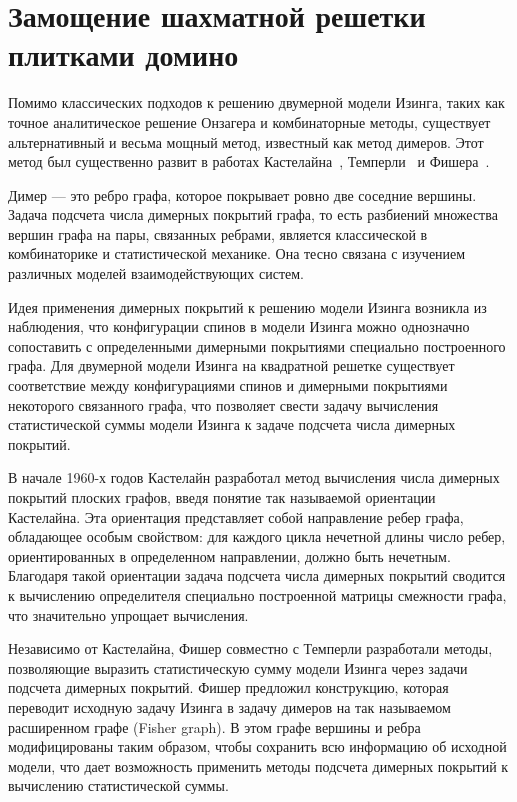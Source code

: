 \documentclass[utf8,12pt]{jetp}
\begin{document}
\section{Замощение шахматной решетки плитками домино}

Помимо классических подходов к решению двумерной модели Изинга, таких как точное аналитическое решение Онзагера и комбинаторные методы, существует альтернативный и весьма мощный метод, известный как метод димеров. Этот метод был существенно развит в работах Кастелайна~\cite{kasteleyn1961, kasteleyn1963_1, kasteleyn1963_2}, Темперли~\cite{temperley1961} и Фишера~\cite{fisher1966}.

Димер — это ребро графа, которое покрывает ровно две соседние вершины. Задача подсчета числа димерных покрытий графа, то есть разбиений множества вершин графа на пары, связанных ребрами, является классической в комбинаторике и статистической механике. Она тесно связана с изучением различных моделей взаимодействующих систем.

Идея применения димерных покрытий к решению модели Изинга возникла из наблюдения, что конфигурации спинов в модели Изинга можно однозначно сопоставить с определенными димерными покрытиями специально построенного графа. Для двумерной модели Изинга на квадратной решетке существует соответствие между конфигурациями спинов и димерными покрытиями некоторого связанного графа, что позволяет свести задачу вычисления статистической суммы модели Изинга к задаче подсчета числа димерных покрытий.

В начале 1960-х годов Кастелайн разработал метод вычисления числа димерных покрытий плоских графов, введя понятие так называемой ориентации Кастелайна. Эта ориентация представляет собой направление ребер графа, обладающее особым свойством: для каждого цикла нечетной длины число ребер, ориентированных в определенном направлении, должно быть нечетным. Благодаря такой ориентации задача подсчета числа димерных покрытий сводится к вычислению определителя специально построенной матрицы смежности графа, что значительно упрощает вычисления.

Независимо от Кастелайна, Фишер совместно с Темперли разработали методы, позволяющие выразить статистическую сумму модели Изинга через задачи подсчета димерных покрытий. Фишер предложил конструкцию, которая переводит исходную задачу Изинга в задачу димеров на так называемом расширенном графе (Fisher graph). В этом графе вершины и ребра модифицированы таким образом, чтобы сохранить всю информацию об исходной модели, что дает возможность применить методы подсчета димерных покрытий к вычислению статистической суммы.
\end{document}
